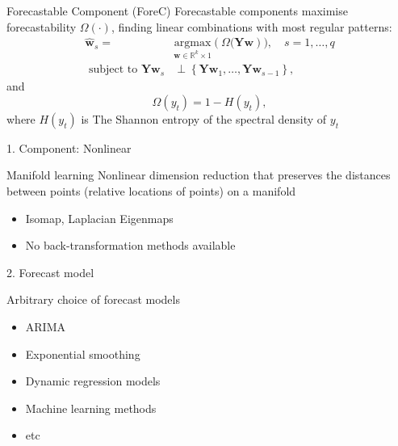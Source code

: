 \documentclass[14pt,ignorenonframetext,]{beamer}
\providecommand{\tightlist}{%
  \setlength{\itemsep}{0pt}\setlength{\parskip}{0pt}}
\begin{document}
\begin{frame}
\begin{block}{Forecastable Component (ForeC)}
\protect\hypertarget{forecastable-component-forec}{}
Forecastable components \citep{Goerg2013-yu} maximise
\alert{forecastability} \(\Omega(\cdot)\), finding linear combinations
with \alert{most regular patterns}: \[\begin{aligned}
\widehat{\mathbf{w}}_{s}=& \underset{\mathbf{w} \in \mathbb{R}^{k} \times 1}{\text{argmax} } \left(\Omega(\mathbf{Y}\mathbf{w} \right)), \quad s=1, \ldots, q \\
\text { subject to } \mathbf{Y}\mathbf{w}_{s}  & \perp\left\{\mathbf{Y} \mathbf{w}_{1}, \ldots, \mathbf{Y}\mathbf{w}_{s-1} \right\},
\end{aligned}\] and \[
\Omega\left(y_{t}\right)=1-H\left(y_{t}\right),
\] where \(H(y_t)\) is The Shannon entropy \citep{Shannon1948-bo} of the
spectral density of \(y_t\)
\end{block}
\end{frame}

\begin{frame}{1. Component: Nonlinear}
\protect\hypertarget{component-nonlinear}{}
\begin{block}{Manifold learning}
\protect\hypertarget{manifold-learning}{}
Nonlinear dimension reduction that preserves the distances between
points (relative locations of points) on a manifold

\begin{itemize}
\tightlist
\item
  Isomap, Laplacian Eigenmaps
\item
  No back-transformation methods available
\end{itemize}
\end{block}
\end{frame}

\begin{frame}{2. Forecast model}
\protect\hypertarget{forecast-model}{}
\begin{block}{Arbitrary choice of forecast models}
\protect\hypertarget{arbitrary-choice-of-forecast-models}{}
\begin{itemize}
\tightlist
\item
  ARIMA
\item
  Exponential smoothing
\item
  Dynamic regression models
\item
  Machine learning methods
\item
  etc
\end{itemize}
\end{block}
\end{frame}
\end{document}
